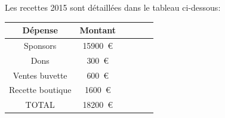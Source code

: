 \Separateur

Les recettes 2015 sont détaillées dans le tableau ci-dessous:

\begin{center}
    \begin{tabular}{|c|c|c|c|c|c|}
        \hline Dépense & Montant \\
        \hline Sponsors & \SI{15900}{\euro} \\
        \hline Dons & \SI{300}{\euro} \\
        \hline Ventes buvette & \SI{600}{\euro} \\
        \hline Recette boutique & \SI{1600}{\euro} \\
        \hline TOTAL & \SI{18200}{\euro} \\
        \hline
    \end{tabular}
\end{center}

